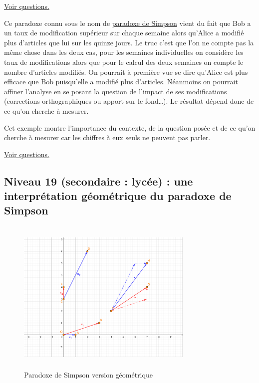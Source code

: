 \documentclass[11pt]{article}
\begin{document}
\hyperref[org7ee7fd8]{Voir questions.}

\newpage

Ce paradoxe connu sous le nom de \href{https://fr.wikipedia.org/wiki/Paradoxe\_de\_Simpson}{paradoxe de Simpson} vient du fait que
Bob a un taux de modification supérieur sur chaque semaine alors
qu'Alice a modifié plus d'articles que lui sur les quinze jours. Le
truc c'est que l'on ne compte pas la même chose dans les deux cas,
pour les semaines individuelles on considère les taux de modifications
alors que pour le calcul des deux semaines on compte le nombre
d'articles modifiés. On pourrait à première vue se dire qu'Alice est
plus efficace que Bob puisqu'elle a modifié plus d'articles. Néanmoins
on pourrait affiner l'analyse en se posant la question de l'impact de
ses modifications (corrections orthographiques ou apport sur le
fond\ldots{}). Le résultat dépend donc de ce qu'on cherche à mesurer.


Cet exemple montre l'importance du contexte, de la question posée et
de ce qu'on cherche à mesurer car les chiffres à eux seuls ne peuvent
pas parler.


\hyperref[org7ee7fd8]{Voir questions.}


\newpage


\subsection{Niveau 19 (secondaire : lycée) : une interprétation géométrique du paradoxe de Simpson}
\label{sec:org40aa173}

\label{orga6ef71f}

\begin{figure}[htbp]
\centering
\includegraphics[width=0.75\textwidth,height=7.5cm]{./images/vect-simpson.png}
\caption{Paradoxe de Simpson version géométrique}
\end{figure}
\end{document}
